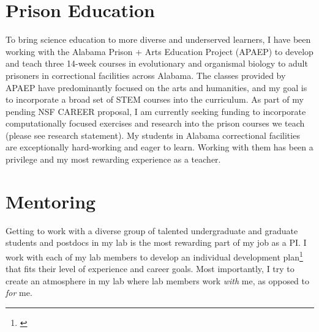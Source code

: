 \section*{Prison Education}
To bring science education to more diverse and underserved learners,
I have been working with
the Alabama Prison + Arts Education Project (APAEP) to develop and teach three
14-week courses in evolutionary and organismal biology to adult prisoners in correctional
facilities across Alabama.
The classes provided by APAEP have predominantly focused on the
arts and humanities, and
my
goal is to incorporate a broad set of STEM courses into the
curriculum.
As part of my pending NSF CAREER proposal, I am currently
seeking funding to incorporate computationally focused
exercises and research into the prison courses we teach
(please see research statement).
My students in Alabama correctional facilities are exceptionally hard-working
and eager to learn.
Working with them has been a privilege and my most rewarding experience as a
teacher.

\section*{Mentoring}
Getting to work with a diverse group of talented undergraduate and graduate
students and postdocs in my lab is the most rewarding part of my job as a
PI.
I work with each of my lab members to develop an individual development
plan\footnote{\label{idp}} that fits
their level of experience and career goals.
Most importantly, I try to create an atmosphere in my lab where
lab members work \emph{with} me, as opposed to \emph{for} me.


